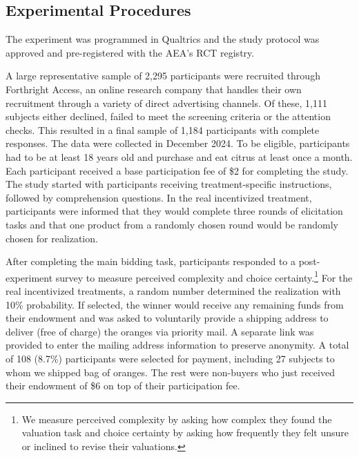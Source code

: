 \documentclass[12pt]{article}
\begin{document}
\subsection{Experimental Procedures}
The experiment was programmed in Qualtrics and the study protocol was approved %
and pre-registered with the AEA's RCT registry.

A large representative sample of 2,295 participants were recruited through Forthright Access, an online research company that handles their own recruitment through a variety of direct advertising channels. Of these, 1,111 subjects either declined, failed to meet the screening criteria or the attention checks. This resulted in a final sample of 1,184 participants with complete responses. The data were collected in December 2024. To be eligible, participants had to be at least 18 years old and purchase and eat citrus at least once a month. 
Each participant received a base participation fee of \$2 for completing the study. The study started with participants receiving treatment-specific instructions, followed by comprehension questions. In the real incentivized treatment, participants were informed that they would complete three rounds of elicitation tasks and that one product from a randomly chosen round would be randomly chosen for realization. 

After completing the main bidding task, participants responded to a post-experiment survey to measure perceived complexity and choice certainty.\footnote{We measure perceived complexity by asking how complex they found the valuation task and choice certainty by asking how frequently they felt unsure or inclined to revise their valuations.} For the real incentivized treatments, a random number determined the realization with 10\% probability.  If selected, the winner would receive any remaining funds from their endowment and was asked to voluntarily provide a shipping address to deliver (free of charge) the oranges via priority mail. A separate link was provided to enter the mailing address information to preserve anonymity. A total of 108 (8.7\%) participants were selected for payment, including 27 subjects to whom we shipped bag of oranges. The rest were non-buyers who just received their endowment of \$6 on top of their participation fee. 
\end{document}
